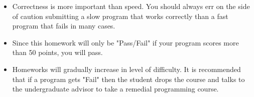 \begin{itemize}
\item Correctness is more important than speed.
You should always err on the side of caution submitting a slow program that works correctly than a fast program
that fails in many cases.

\item Since this homework will only be "Pass/Fail" if your program scores more than 50 points, you will pass.

\item Homeworks will gradually increase in level of difficulty.
It is recommended that if a program gets "Fail" then the student drops the course and talks to 
the undergraduate advisor to take a remedial programming course.
\end{itemize}


% 



